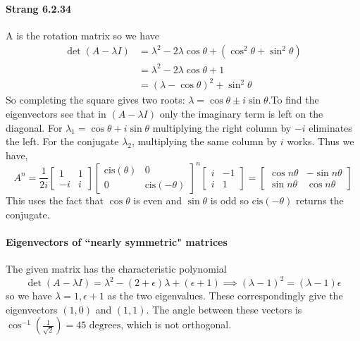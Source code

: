 \documentclass[10pt]{scrartcl}
\begin{document}
\paragraph{Strang 6.2.34} A is the rotation matrix so we have
\begin{align} 
\det{(A-\lambda I)} &= \lambda^2 - 2\lambda\cos{\theta} + (\cos^2{\theta} + \sin^2{\theta})\\
	&= \lambda^2 - 2\lambda\cos{\theta} + 1\\
	&= (\lambda - \cos{\theta})^2 + \sin^2{\theta}
\end{align}
So completing the square gives two roots: $\lambda = \cos{\theta}\pm i\sin{\theta}$.To find the eigenvectors see that in $(A-\lambda I)$ only the imaginary term is left on the diagonal. For $\lambda_1=\cos{\theta}+i\sin{\theta}$ multiplying the right column by $-i$ eliminates the left. For the conjugate $\lambda_2$, multiplying the same column by $i$ works. Thus we have,
\[A^{n} = \frac{1}{2i}\begin{bmatrix}1&1\\-i& i\end{bmatrix}\begin{bmatrix}\text{cis}(\theta)&0\\0&\text{cis}(-\theta)\end{bmatrix}^n\begin{bmatrix}i&-1\\i&1\end{bmatrix}=\begin{bmatrix}\cos{n\theta}& -\sin{n\theta}\\ \sin{n\theta}& \cos{n\theta}\end{bmatrix}\]
This uses the fact that $\cos{\theta}$ is even and $\sin{\theta}$ is odd so $\text{cis}(-\theta)$ returns the conjugate.  

\paragraph{Eigenvectors of ``nearly symmetric" matrices} The given matrix has the characteristic polynomial
\[\det{(A-\lambda I)} = \lambda^2 -(2+\epsilon)\lambda + (\epsilon+1) \implies (\lambda-1)^2 = (\lambda-1)\epsilon\]
so we have $\lambda=1,\epsilon+1$ as the two eigenvalues. These correspondingly give the eigenvectors $(1,0)$ and $(1,1)$. The angle between these vectors is $\cos^{-1}\left(\frac{1}{\sqrt{2}}\right)=45\text{ degrees}$, which is not orthogonal. 
\end{document}
